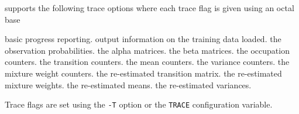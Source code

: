 
 supports the following trace options where each
trace flag is given using an octal base
\begin{optlist}
    basic progress reporting.
    output information on the training data loaded.
    the observation probabilities.
    the alpha matrices.
    the beta matrices.
    the occupation counters.
    the transition counters.
    the mean counters.
    the variance counters.
    the mixture weight counters.
    the re-estimated transition matrix.
    the re-estimated mixture weights.
    the re-estimated means.
    the re-estimated variances.
\end{optlist}
Trace flags are set using the \texttt{-T} option or the  \texttt{TRACE} 
configuration variable.


